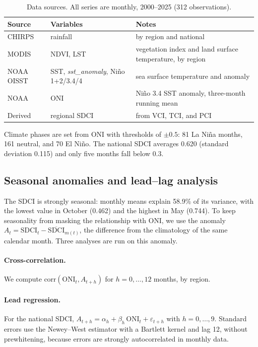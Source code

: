 \documentclass[11pt,twoside]{article}
\begin{document}
\begin{table}[ht]
\centering
\caption{Data sources. All series are monthly, 2000--2025 (312 observations).}
\label{Tab:Data}
\small
\begin{tabular}{llp{6.2cm}}
\toprule
Source & Variables & Notes \\
\midrule
CHIRPS \cite{funk2015chirps} & rainfall & by region and national \\
MODIS & NDVI, LST & vegetation index and land surface temperature, by region \\
NOAA OISST \cite{huang2021oisst} & SST, \textit{sst\_anomaly}, Ni\~no 1+2/3.4/4 & sea surface temperature and anomaly \\
NOAA & ONI \cite{trenberth1997enso} & Ni\~no 3.4 SST anomaly, three-month running mean \\
Derived & regional SDCI & from VCI, TCI, and PCI \\
\bottomrule
\end{tabular}
\end{table}

Climate phases are set from ONI with thresholds of $\pm 0.5$: 81 La Ni\~na months, 161 neutral, and 70 El Ni\~no. The national SDCI averages 0.620 (standard deviation 0.115) and only five months fall below 0.3.

\subsection{Seasonal anomalies and lead--lag analysis}
\label{SubSec:LeadLag}

The SDCI is strongly seasonal: monthly means explain 58.9\% of its variance, with the lowest value in October (0.462) and the highest in May (0.744). To keep seasonality from masking the relationship with ONI, we use the anomaly $A_t = \mathrm{SDCI}_t - \overline{\mathrm{SDCI}}_{m(t)}$, the difference from the climatology of the same calendar month. Three analyses are run on this anomaly.

\paragraph{Cross-correlation.} We compute $\mathrm{corr}(\mathrm{ONI}_t, A_{t+h})$ for $h = 0,\dots,12$ months, by region.

\paragraph{Lead regression.} For the national SDCI, $A_{t+h} = \alpha_h + \beta_h\,\mathrm{ONI}_t + \varepsilon_{t+h}$ with $h = 0,\dots,9$. Standard errors use the Newey--West estimator \cite{newey1987hac} with a Bartlett kernel and lag 12, without prewhitening, because errors are strongly autocorrelated in monthly data.
\end{document}
